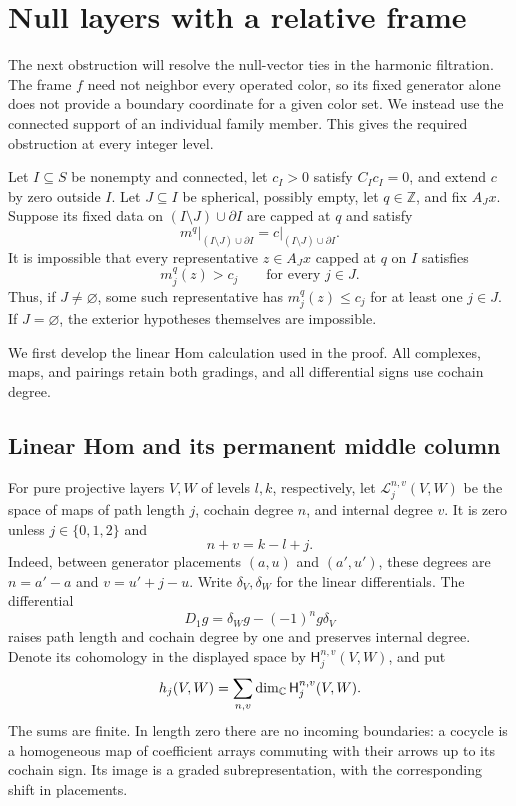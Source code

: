 \section{Null layers with a relative frame}
\label{sec:null}

The next obstruction will resolve the null-vector ties in the harmonic
filtration.  The frame $f$ need not neighbor every operated color, so its
fixed generator alone does not provide a boundary coordinate for a given
color set.  We instead use the connected support of an individual family
member.  This gives the required obstruction at every integer level.

\begin{proposition}
\label{null:obstruction}
Let $I\subseteq S$ be nonempty and connected, let $c_I>0$ satisfy
$C_Ic_I=0$, and extend $c$ by zero outside $I$.  Let $J\subseteq I$ be
spherical, possibly empty, let $q\in\mathbb Z$, and fix $A_Jx$.
Suppose its fixed data on $(I\setminus J)\cup\partial I$ are capped at
$q$ and satisfy
\begin{equation}
 m^q\big|_{(I\setminus J)\cup\partial I}
   =c\big|_{(I\setminus J)\cup\partial I}.
 \label{null:exterior}
\end{equation}
It is impossible that every representative $z\in A_Jx$ capped at $q$
on $I$ satisfies
\begin{equation}
 m_j^q(z)>c_j\qquad\text{for every }j\in J.
 \label{null:strict}
\end{equation}
Thus, if $J\ne\varnothing$, some such representative has
$m_j^q(z)\le c_j$ for at least one $j\in J$.  If $J=\varnothing$,
the exterior hypotheses themselves are impossible.
\end{proposition}

We first develop the linear Hom calculation used in the proof.  All
complexes, maps, and pairings retain both gradings, and all differential
signs use cochain degree.

\subsection{Linear Hom and its permanent middle column}

For pure projective layers $V,W$ of levels $l,k$, respectively, let
$\mathcal L_j^{n,v}(V,W)$ be the space of maps of path length $j$,
cochain degree $n$, and internal degree $v$.  It is zero unless
$j\in\{0,1,2\}$ and
\begin{equation}
 n+v=k-l+j.
 \label{null:hom-degree}
\end{equation}
Indeed, between generator placements $(a,u)$ and $(a',u')$, these
degrees are $n=a'-a$ and $v=u'+j-u$.  Write $\delta_V,\delta_W$ for
the linear differentials.  The differential
\[
 D_1g=\delta_Wg-(-1)^n g\delta_V
\]
raises path length and cochain degree by one and preserves internal
degree.  Denote its cohomology in the displayed space by
$\mathsf H_j^{n,v}(V,W)$, and put
\[
 h_j(V,W)=\sum_{n,v}\dim_{\mathbb C}\mathsf H_j^{n,v}(V,W).
\]
The sums are finite.  In length zero there are no incoming boundaries:
a cocycle is a homogeneous map of coefficient arrays commuting with
their arrows up to its cochain sign.  Its image is a graded
subrepresentation, with the corresponding shift in placements.

